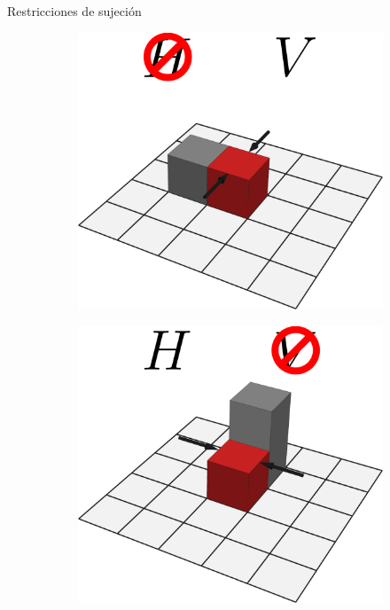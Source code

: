 \documentclass[14pt, aspectratio = 1610, xcolor=table, structureblod]{beamer}
\begin{document}
\begin{frame}{Restricciones de sujeción}
	\captionsetup[figure]{
		labelformat = empty, 
		format = hang, 
		justification = justified, 
		belowskip = 4pt, 
		aboveskip = -1pt
	}%
	\begin{figure}[H]
	\def\figswidth{0.25\textwidth}%
	\def\figshsep{1cm}%
		\caption{Ejemplos de cómo se pueden restringir las formas de sujeción en función de la vecindad de un objeto.}%
    	\begin{subfigure}{\figswidth}
			\includegraphics[width=\textwidth]{restriccion_H_cubo}
    	\end{subfigure}
    	\hskip \figshsep%
    	\begin{subfigure}{\figswidth}
       		\includegraphics[width=\textwidth]{restriccion_V_cubo}

\end{subfigure}
\end{figure}
\end{frame}
\end{document}
